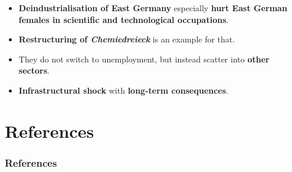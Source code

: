 \documentclass[11pt, aspectratio=1610, xcolor={dvipsnames}]{beamer}
\newcommand{\highlight}[1]{\textbf{\textcolor{PineGreen}{#1}}}
\begin{document}
	\begin{frame}
		\frametitle{}
		
		\begin{itemize}
			\item \highlight{Deindustrialisation of East Germany} especially \highlight{hurt East German females in scientific and technological occupations}.
			\item \highlight{Restructuring of \emph{Chemiedreieck}} is an example for that.
			\item They do not switch to unemployment, but instead scatter into \highlight{other sectors}.
			\item \highlight{Infrastructural shock} with \highlight{long-term consequences}.
		\end{itemize}
		
	\end{frame}
	
	\section*{References}
	\begin{frame}[allowframebreaks]
		\frametitle{References}
		
		{\scriptsize
		
		}
		
	\end{frame}
	
	\appendix
	
\end{document}
